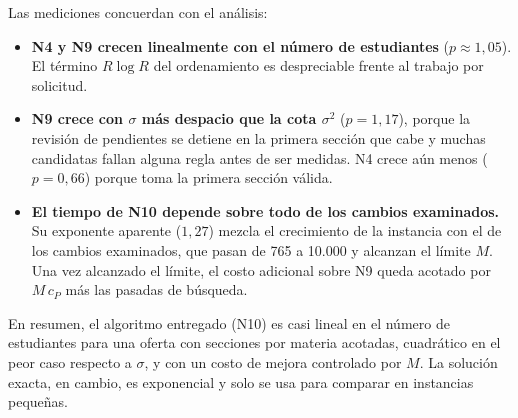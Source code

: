 Las mediciones concuerdan con el análisis:
\begin{itemize}
\item \textbf{N4 y N9 crecen linealmente con el número de estudiantes} ($p \approx 1{,}05$). El término $R\log R$ del ordenamiento es despreciable frente al trabajo por solicitud.
\item \textbf{N9 crece con $\sigma$ más despacio que la cota $\sigma^2$} ($p = 1{,}17$), porque la revisión de pendientes se detiene en la primera sección que cabe y muchas candidatas fallan alguna regla antes de ser medidas. N4 crece aún menos ($p = 0{,}66$) porque toma la primera sección válida.
\item \textbf{El tiempo de N10 depende sobre todo de los cambios examinados.} Su exponente aparente ($1{,}27$) mezcla el crecimiento de la instancia con el de los cambios examinados, que pasan de 765 a 10.000 y alcanzan el límite $M$. Una vez alcanzado el límite, el costo adicional sobre N9 queda acotado por $M\,c_P$ más las pasadas de búsqueda.
\end{itemize}

En resumen, el algoritmo entregado (N10) es casi lineal en el número de estudiantes para una oferta con secciones por materia acotadas, cuadrático en el peor caso respecto a $\sigma$, y con un costo de mejora controlado por $M$. La solución exacta, en cambio, es exponencial y solo se usa para comparar en instancias pequeñas.
